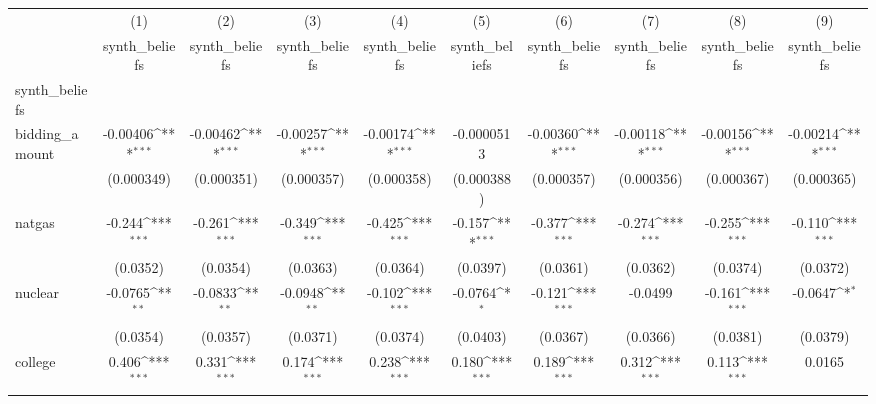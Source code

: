 {
\def\sym#1{\ifmmode^{#1}\else\(^{#1}\)\fi}
\begin{tabular}{l*{9}{c}}
\hline\hline
            &\multicolumn{1}{c}{(1)}&\multicolumn{1}{c}{(2)}&\multicolumn{1}{c}{(3)}&\multicolumn{1}{c}{(4)}&\multicolumn{1}{c}{(5)}&\multicolumn{1}{c}{(6)}&\multicolumn{1}{c}{(7)}&\multicolumn{1}{c}{(8)}&\multicolumn{1}{c}{(9)}\\
            &\multicolumn{1}{c}{synth\_beliefs}&\multicolumn{1}{c}{synth\_beliefs}&\multicolumn{1}{c}{synth\_beliefs}&\multicolumn{1}{c}{synth\_beliefs}&\multicolumn{1}{c}{synth\_beliefs}&\multicolumn{1}{c}{synth\_beliefs}&\multicolumn{1}{c}{synth\_beliefs}&\multicolumn{1}{c}{synth\_beliefs}&\multicolumn{1}{c}{synth\_beliefs}\\
\hline
synth\_beliefs&                     &                     &                     &                     &                     &                     &                     &                     &                     \\
bidding\_amount&    -0.00406\sym{***}&    -0.00462\sym{***}&    -0.00257\sym{***}&    -0.00174\sym{***}&  -0.0000513         &    -0.00360\sym{***}&    -0.00118\sym{***}&    -0.00156\sym{***}&    -0.00214\sym{***}\\
            &  (0.000349)         &  (0.000351)         &  (0.000357)         &  (0.000358)         &  (0.000388)         &  (0.000357)         &  (0.000356)         &  (0.000367)         &  (0.000365)         \\
[1em]
natgas      &      -0.244\sym{***}&      -0.261\sym{***}&      -0.349\sym{***}&      -0.425\sym{***}&      -0.157\sym{***}&      -0.377\sym{***}&      -0.274\sym{***}&      -0.255\sym{***}&      -0.110\sym{***}\\
            &    (0.0352)         &    (0.0354)         &    (0.0363)         &    (0.0364)         &    (0.0397)         &    (0.0361)         &    (0.0362)         &    (0.0374)         &    (0.0372)         \\
[1em]
nuclear     &     -0.0765\sym{**} &     -0.0833\sym{**} &     -0.0948\sym{**} &      -0.102\sym{***}&     -0.0764\sym{*}  &      -0.121\sym{***}&     -0.0499         &      -0.161\sym{***}&     -0.0647\sym{*}  \\
            &    (0.0354)         &    (0.0357)         &    (0.0371)         &    (0.0374)         &    (0.0403)         &    (0.0367)         &    (0.0366)         &    (0.0381)         &    (0.0379)         \\
[1em]
college     &       0.406\sym{***}&       0.331\sym{***}&       0.174\sym{***}&       0.238\sym{***}&       0.180\sym{***}&       0.189\sym{***}&       0.312\sym{***}&       0.113\sym{***}&      0.0165         \\

\end{tabular}}
